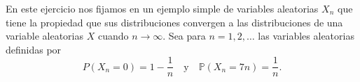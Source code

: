 \question

	En este ejercicio nos fijamos en un ejemplo simple de variables aleatorias $X_n$ que tiene la propiedad que sus distribuciones convergen a las distribuciones de una variable aleatorias $X$ cuando $n\to\infty$. Sea para $n=1,2,\ldots$ las variables aleatorias definidas por
	\[
		P\left(X_n=0\right)=1-\frac{1}{n}\quad\text{y}\quad\mathds{P}\left(X_n=7n\right)=\frac{1}{n}.
	\]

	\begin{solutionordottedlines}
		
	\end{solutionordottedlines}